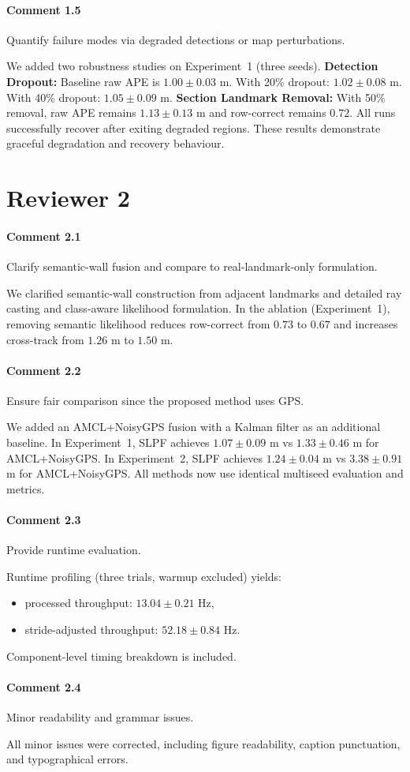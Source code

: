 \documentclass[a4paper]{article}
\def\answer#1#2{
  \begin{tcolorbox}[width=\textwidth,colback={white},title={\textbf{Answer
    #1}},colbacktitle=answerBoxColor,coltitle=white] #2
\end{tcolorbox} }
\begin{document}
\paragraph{Comment 1.5}
{\color{commentColor}
  Quantify failure modes via degraded detections or map perturbations.
}
\answer{1.5}{
  We added two robustness studies on Experiment~1 (three seeds).
  \textbf{Detection Dropout:}
  Baseline raw APE is $1.00\pm0.03$ m.
  With 20\% dropout: $1.02\pm0.08$ m.
  With 40\% dropout: $1.05\pm0.09$ m.
  \textbf{Section Landmark Removal:}
  With 50\% removal, raw APE remains $1.13\pm0.13$ m and row-correct remains $0.72$.
  All runs successfully recover after exiting degraded regions.
  These results demonstrate graceful degradation and recovery behaviour.
}

\newpage
\section*{Reviewer 2}

\paragraph{Comment 2.1}
{\color{commentColor}
  Clarify semantic-wall fusion and compare to real-landmark-only formulation.
}
\answer{2.1}{
  We clarified semantic-wall construction from adjacent landmarks and detailed ray casting and class-aware likelihood formulation.
  In the ablation (Experiment~1), removing semantic likelihood reduces row-correct from $0.73$ to $0.67$ and increases cross-track from $1.26$ m to $1.50$ m.
}

\paragraph{Comment 2.2}
{\color{commentColor}
  Ensure fair comparison since the proposed method uses GPS.
}
\answer{2.2}{
  We added an AMCL+NoisyGPS fusion with a Kalman filter as an additional baseline.
  In Experiment~1, SLPF achieves $1.07\pm0.09$ m vs $1.33\pm0.46$ m for AMCL+NoisyGPS.
  In Experiment~2, SLPF achieves $1.24\pm0.04$ m vs $3.38\pm0.91$ m for AMCL+NoisyGPS.
  All methods now use identical multiseed evaluation and metrics.
}

\paragraph{Comment 2.3}
{\color{commentColor}
  Provide runtime evaluation.
}
\answer{2.3}{
  Runtime profiling (three trials, warmup excluded) yields:
  \begin{itemize}
    \item processed throughput: $13.04\pm0.21$ Hz,
    \item stride-adjusted throughput: $52.18\pm0.84$ Hz.
  \end{itemize}
  Component-level timing breakdown is included.
}

\paragraph{Comment 2.4}
{\color{commentColor}
  Minor readability and grammar issues.
}
\answer{2.4}{
  All minor issues were corrected, including figure readability, caption punctuation, and typographical errors.
}
\end{document}
